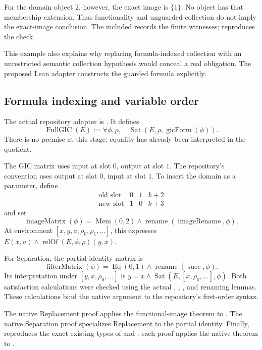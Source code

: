 \documentclass[11pt,letterpaper]{article}
\newcommand{\code}[1]{\texttt{\detokenize{#1}}}
\newcommand{\FullGIC}{\operatorname{FullGIC}}
\begin{document}
For the domain object \(2\), however, the exact image is \(\{1\}\).
No object has that membership extension. Thus functionality and unguarded
collection do not imply the exact-image conclusion. The included
 records the finite witnesses;
 reproduces the check.

This example also explains why replacing formula-indexed collection with an
unrestricted semantic collection hypothesis would conceal a real obligation.
The proposed Lean adapter constructs the guarded formula explicitly.

\subsection{Formula indexing and variable order}

The actual repository adapter is .
It defines
\[
 \FullGIC(E):=\forall\phi,\rho,\quad
       \operatorname{Sat}(E,\rho,\operatorname{gicForm}(\phi)).
\]
There is no \code{EqualityFree phi} premise at this stage: equality has
already been interpreted in the quotient.

The GIC matrix uses input at slot \(0\), output at slot \(1\).
The repository's \code{relOf} convention uses output at slot \(0\),
input at slot \(1\). To insert the domain as a parameter, define
\[
 \begin{array}{c|ccc}
 \text{old slot}&0&1&k+2\\ \hline
 \text{new slot}&1&0&k+3
 \end{array}
\]
and set
\[
 \operatorname{imageMatrix}(\phi)
 =\operatorname{Mem}(0,2)\land
   \operatorname{rename}(\operatorname{imageRename},\phi).
\]
At environment \([x,y,a,\rho_0,\rho_1,\ldots]\), this expresses
\(E(x,a)\land\operatorname{relOf}(E,\phi,\rho)(y,x)\).

For Separation, the partial-identity matrix is
\[
 \operatorname{filterMatrix}(\phi)
 =\operatorname{Eq}(0,1)\land\operatorname{rename}(\operatorname{succ},\phi).
\]
Its interpretation under \([y,x,\rho_0,\ldots]\) is
\(y=x\land\operatorname{Sat}(E,[x,\rho_0,\ldots],\phi)\).
Both satisfaction calculations were checked using the actual
\code{Form}, \code{Sat}, \code{relOf}, and renaming lemmas.
These calculations bind the native argument to the repository's first-order syntax.

The native Replacement proof applies the functional-image theorem to
. The native Separation proof specializes Replacement
to the partial identity. Finally,
 reproduces the exact existing types
of  and ;
each proof applies the native theorem to .
\end{document}
